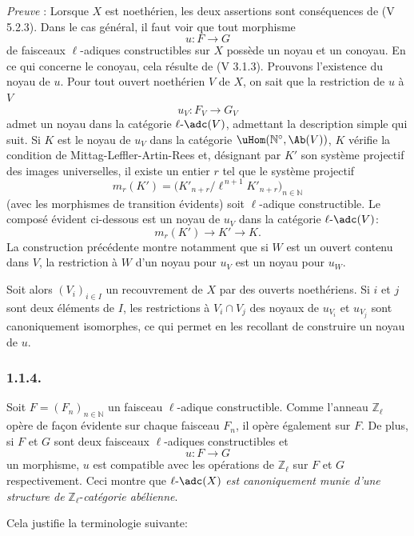 \emph{Preuve} : Lorsque \(X\) est noethérien, les deux assertions sont conséquences de (V 5.2.3). Dans le cas général, il faut voir que tout morphisme
\[
u:F\longrightarrow G
\]
de faisceaux \(\ell\)-adiques constructibles sur \(X\) possède un noyau et un conoyau.
En ce qui
concerne le conoyau, cela résulte de (V 3.1.3). Prouvons l'existence du noyau de \(u\). Pour tout ouvert noethérien \(V\) de \(X\), on sait que la restriction de \(u\) à \(V\)
\[
u_V:F_V\longrightarrow G_V
\]
admet un noyau dans la catégorie \(\ell\text{-}\adc(V)\), admettant la description simple qui suit. Si \(K\) est le noyau de \(u_V\) dans la catégorie \(\uHom(\mathbb{N}^\circ,\Ab(V))\), \(K\) vérifie la condition de Mittag-Leffler-Artin-Rees et, désignant par \(K'\) son système projectif des images universelles, il existe un entier \(r\) tel que le système projectif
\[
m_r(K')=\bigl(K'_{n+r}/\ell^{\,n+1}K'_{n+r}\bigr)_{n\in\mathbb{N}}
\]
(avec les morphismes de transition évidents) soit \(\ell\)-adique constructible. Le composé évident ci-dessous est un noyau de \(u_V\) dans la catégorie \(\ell\text{-}\adc(V)\):
\[
m_r(K')\longrightarrow K'\longrightarrow K.
\]
La construction précédente montre notamment que si \(W\) est un ouvert contenu dans \(V\), la restriction à \(W\) d'un noyau pour \(u_V\) est un noyau pour \(u_W\).

Soit alors \((V_i)_{i\in I}\) un recouvrement de \(X\) par des ouverts noethériens. Si \(i\) et \(j\) sont deux éléments de \(I\), les restrictions à \(V_i\cap V_j\) des noyaux de \(u_{V_i}\) et \(u_{V_j}\) sont canoniquement isomorphes, ce qui permet en les recollant de construire un noyau de \(u\).

\subsubsection*{1.1.4.}
Soit \(F=(F_n)_{n\in\mathbb{N}}\) un faisceau \(\ell\)-adique constructible. Comme l'anneau \(\mathbb{Z}_\ell\) opère de façon évidente sur chaque faisceau \(F_n\), il opère également sur \(F\). De plus, si \(F\) et \(G\) sont deux faisceaux \(\ell\)-adiques constructibles et
\[
u:F\longrightarrow G
\]
un
morphisme, \(u\) est compatible avec les opérations de \(\mathbb{Z}_\ell\) sur \(F\) et \(G\) respectivement. Ceci montre que \(\ell\text{-}\adc(X)\) \emph{est canoniquement munie d'une structure de} \(\mathbb{Z}_\ell\)-\emph{catégorie abélienne}.

Cela justifie la terminologie suivante:

